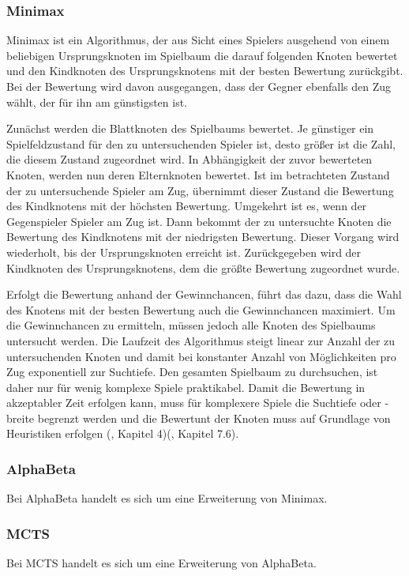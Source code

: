 \subsubsection{Minimax}

Minimax ist ein Algorithmus, der aus Sicht eines Spielers ausgehend von einem beliebigen Ursprungsknoten im Spielbaum die darauf folgenden Knoten bewertet und den Kindknoten des Ursprungsknotens mit der besten Bewertung zurückgibt. Bei der Bewertung wird davon ausgegangen, dass der Gegner ebenfalls den Zug wählt, der für ihn am günstigsten ist.

Zunächst werden die Blattknoten des Spielbaums bewertet. Je günstiger ein Spielfeldzustand für den zu untersuchenden Spieler ist, desto größer ist die Zahl, die diesem Zustand zugeordnet wird. In Abhängigkeit der zuvor bewerteten Knoten, werden nun deren Elternknoten bewertet. Ist im betrachteten Zustand der zu untersuchende Spieler am Zug, übernimmt dieser Zustand die Bewertung des Kindknotens mit der höchsten Bewertung. Umgekehrt ist es, wenn der Gegenspieler Spieler am Zug ist. Dann bekommt der zu untersuchte Knoten die Bewertung des Kindknotens mit der niedrigsten Bewertung. Dieser Vorgang wird wiederholt, bis der Ursprungsknoten erreicht ist. Zurückgegeben wird der Kindknoten des Ursprungsknotens, dem die größte Bewertung zugeordnet wurde.

Erfolgt die Bewertung anhand der Gewinnchancen, führt das dazu, dass die Wahl des Knotens mit der besten Bewertung auch die Gewinnchancen maximiert. Um die Gewinnchancen zu ermitteln, müssen jedoch alle Knoten des Spielbaums untersucht werden. Die Laufzeit des Algorithmus steigt linear zur Anzahl der zu untersuchenden Knoten und damit bei konstanter Anzahl von Möglichkeiten pro Zug exponentiell zur Suchtiefe. Den gesamten Spielbaum zu durchsuchen, ist daher nur für wenig komplexe Spiele praktikabel. Damit die Bewertung in akzeptabler Zeit erfolgen kann, muss für komplexere Spiele die Suchtiefe oder -breite begrenzt werden und die Bewertunt der Knoten muss auf Grundlage von Heuristiken erfolgen (\cite{Ferguson.January2019}, Kapitel 4)(\cite{Heineman.October2008}, Kapitel 7.6).

\subsubsection{AlphaBeta}

Bei AlphaBeta handelt es sich um eine Erweiterung von Minimax.

\subsubsection{MCTS}

Bei MCTS handelt es sich um eine Erweiterung von AlphaBeta.
